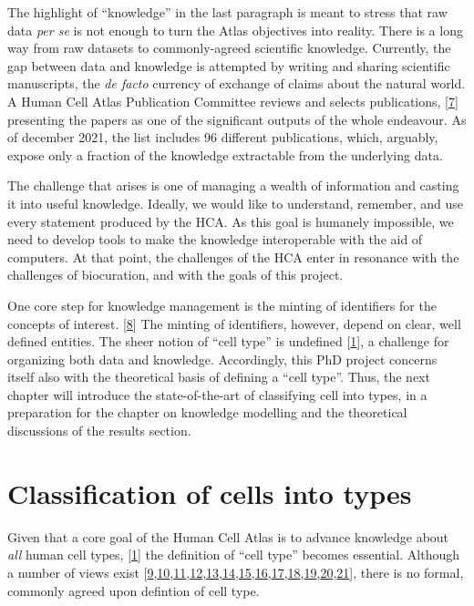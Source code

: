 The highlight of ``knowledge'' in the last paragraph is meant to stress that raw data \emph{per se} is not enough to turn the Atlas objectives into reality.
There is a long way from raw datasets to commonly-agreed scientific knowledge.
Currently, the gap between data and knowledge is attempted by writing and sharing scientific manuscripts, the \emph{de facto} currency of exchange of claims about the natural world.
A Human Cell Atlas Publication Committee reviews and selects publications, {[}\protect\hyperlink{ref-2A7P3sTH}{7}{]} presenting the papers as one of the significant outputs of the whole endeavour.
As of december 2021, the list includes 96 different publications, which, arguably, expose only a fraction of the knowledge extractable from the underlying data.

The challenge that arises is one of managing a wealth of information and casting it into useful knowledge.
Ideally, we would like to understand, remember, and use every statement produced by the HCA.
As this goal is humanely impossible, we need to develop tools to make the knowledge interoperable with the aid of computers.
At that point, the challenges of the HCA enter in resonance with the challenges of biocuration, and with the goals of this project.

One core step for knowledge management is the minting of identifiers for the concepts of interest. {[}\protect\hyperlink{ref-tvnuubVW}{8}{]}
The minting of identifiers, however, depend on clear, well defined entities.
The sheer notion of ``cell type'' is undefined {[}\protect\hyperlink{ref-1GmbExweg}{1}{]}, a challenge for organizing both data and knowledge.
Accordingly, this PhD project concerns itself also with the theoretical basis of defining a ``cell type''.
Thus, the next chapter will introduce the state-of-the-art of classifying cell into types, in a preparation for the chapter on knowledge modelling and the theoretical discussions of the results section.

\hypertarget{classification-of-cells-into-types}{%
\section{Classification of cells into types}\label{classification-of-cells-into-types}}

Given that a core goal of the Human Cell Atlas is to advance knowledge about \emph{all} human cell types, {[}\protect\hyperlink{ref-1GmbExweg}{1}{]} the definition of ``cell type'' becomes essential.
Although a number of views exist {[}\protect\hyperlink{ref-paKiKTRS}{9},\protect\hyperlink{ref-sWv3okaH}{10},\protect\hyperlink{ref-19yYJWEkz}{11},\protect\hyperlink{ref-BlxFp1v3}{12},\protect\hyperlink{ref-eOUB1Bmj}{13},\protect\hyperlink{ref-TupzTvtA}{14},\protect\hyperlink{ref-w0Woz7JE}{15},\protect\hyperlink{ref-srfuRMe}{16},\protect\hyperlink{ref-1GXQByEaQ}{17},\protect\hyperlink{ref-k0Pe9YOB}{18},\protect\hyperlink{ref-pNGap1Du}{19},\protect\hyperlink{ref-MoaYZAA0}{20},\protect\hyperlink{ref-WAeCfntu}{21}{]}, there is no formal, commonly agreed upon defintion of cell type.

